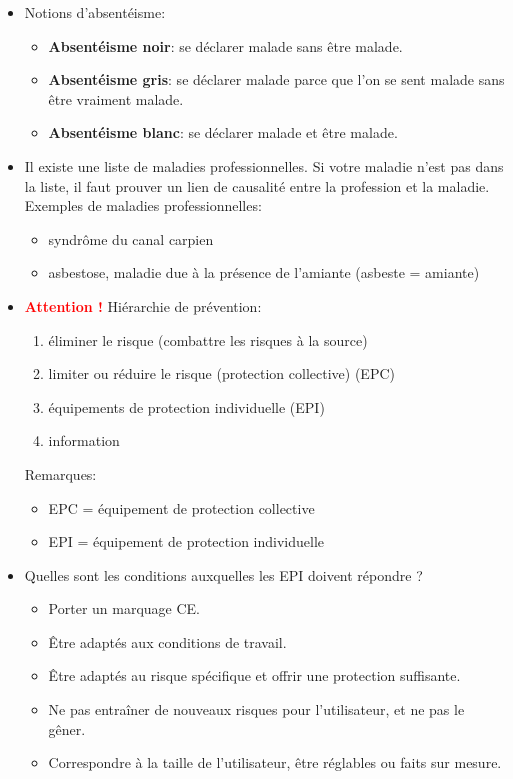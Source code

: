 \documentclass[a4paper]{article}
\begin{document}
\begin{itemize}
\item Notions d’absentéisme:
\begin{itemize}
    \item \textbf{Absentéisme noir}: se déclarer malade sans être malade.
    \item \textbf{Absentéisme gris}: se déclarer malade parce que l'on se sent malade sans être vraiment malade.
    \item \textbf{Absentéisme blanc}: se déclarer malade et être malade.
\end{itemize}





\item Il existe une liste de maladies professionnelles. Si votre maladie n'est pas dans la liste, il faut prouver un lien de causalité entre la profession et la maladie. \\
Exemples de maladies professionnelles:
\begin{itemize}
    \item syndrôme du canal carpien
    \item asbestose, maladie due à la présence de l'amiante (asbeste = amiante)
\end{itemize}





\item \textcolor{red}{\textbf{Attention !}} Hiérarchie de prévention:
\begin{enumerate}
    \item éliminer le risque (combattre les risques à la source)
    \item limiter ou réduire le risque (protection collective) (EPC)
    \item équipements de protection individuelle (EPI)
    \item information
\end{enumerate}
Remarques:
\begin{itemize}
    \item EPC = équipement de protection collective
    \item EPI = équipement de protection individuelle
\end{itemize}





\item Quelles sont les conditions auxquelles les EPI doivent répondre ?
\begin{itemize}
    \item Porter un marquage CE.
    \item Être adaptés aux conditions de travail.
    \item Être adaptés au risque spécifique et offrir une protection suffisante.
    \item Ne pas entraîner de nouveaux risques pour l’utilisateur, et ne pas le gêner.
    \item Correspondre à la taille de l’utilisateur, être réglables ou faits sur mesure.
\end{itemize}






\end{itemize}
\end{document}
